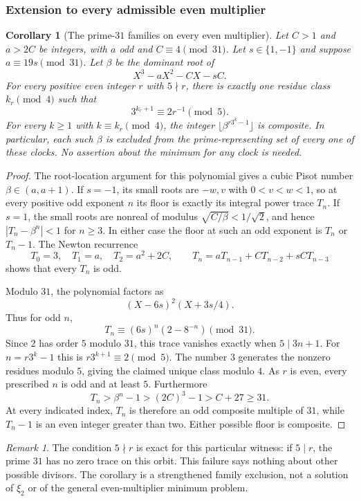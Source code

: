 \documentclass[11pt,a4paper]{article}
\newtheorem{corollary}[theorem]{Corollary}\newtheorem{mainthm}[theorem]{Theorem}
\theoremstyle{definition}\newtheorem{definition}[theorem]{Definition}
\theoremstyle{remark}\newtheorem{remark}[theorem]{Remark}
\begin{document}
\subsubsection{Extension to every admissible even multiplier}
\begin{corollary}[The prime-$31$ families on every even multiplier]
\label{R06:audit06:even-multipliers}
Let $C>1$ and $a>2C$ be integers, with $a$ odd and
$C\equiv4\pmod{31}$. Let $s\in\{1,-1\}$ and suppose
$a\equiv19s\pmod{31}$. Let $\beta$ be the dominant root of
\[
                 X^3-aX^2-CX-sC.
\]
For every positive even integer $r$ with $5\nmid r$, there is exactly
one residue class $k_r\pmod4$ such that
\[
 3^{k_r+1}\equiv 2r^{-1}\pmod5.
\]
For every $k\ge1$ with $k\equiv k_r\pmod4$, the integer
$\lfloor\beta^{r3^k-1}\rfloor$ is composite. In particular, each
such $\beta$ is excluded from the prime-representing set of every
one of these clocks. No assertion about the minimum for any clock
is needed.
\end{corollary}
\begin{proof}
The root-location argument for this polynomial gives a cubic Pisot
number $\beta\in(a,a+1)$. If $s=-1$, its small roots are $-w,v$
with $0<v<w<1$, so at every positive odd exponent $n$ its floor is
exactly its integral power trace $T_n$. If $s=1$, the small roots
are nonreal of modulus $\sqrt{C/\beta}<1/\sqrt2$, and hence
$|T_n-\beta^n|<1$ for $n\ge3$. In either case the floor at such an
odd exponent is $T_n$ or $T_n-1$. The Newton recurrence
\[
 T_0=3,\quad T_1=a,\quad T_2=a^2+2C,\qquad
 T_n=aT_{n-1}+CT_{n-2}+sCT_{n-3}
\]
shows that every $T_n$ is odd.

Modulo $31$, the polynomial factors as
\[
 (X-6s)^2(X+3s/4).
\]
Thus for odd $n$,
\[
 T_n\equiv(6s)^n(2-8^{-n})\pmod{31}.
\]
Since $2$ has order $5$ modulo $31$, this trace vanishes exactly
when $5\mid3n+1$. For $n=r3^k-1$ this is
$r3^{k+1}\equiv2\pmod5$. The number $3$ generates the nonzero
residues modulo $5$, giving the claimed unique class modulo $4$.
As $r$ is even, every prescribed $n$ is odd and at least $5$.
Furthermore
\[
 T_n>\beta^n-1>(2C)^3-1>C+27\ge31.
\]
At every indicated index, $T_n$ is therefore an odd composite
multiple of $31$, while $T_n-1$ is an even integer greater than two.
Either possible floor is composite.
\end{proof}

\begin{remark}
The condition $5\nmid r$ is exact for this particular witness:
if $5\mid r$, the prime $31$ has no zero trace on this orbit. This
failure says nothing about other possible divisors. The corollary
is a strengthened family exclusion, not a solution of $\xi_2$ or
of the general even-multiplier minimum problem.
\end{remark}
\end{document}
